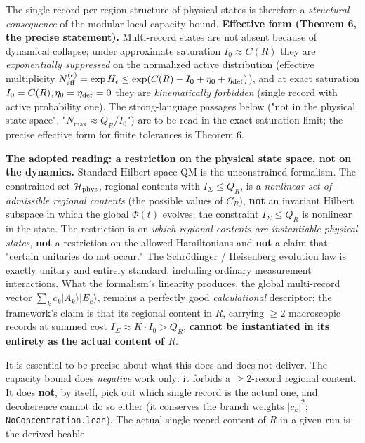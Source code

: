 \documentclass[11pt,a4paper]{article}
\begin{document}
The single-record-per-region structure of physical states is therefore a \emph{structural consequence} of the modular-local capacity bound. \textbf{Effective form (Theorem 6, the precise statement).} Multi-record states are not absent because of dynamical collapse; under approximate saturation $I_0 \approx C(R)$ they are \emph{exponentially suppressed} on the normalized active distribution (effective multiplicity $N^{(\epsilon)}_{\rm eff} = \exp H_\epsilon \le \exp(C(R) - I_0 + \eta_0 + \eta_{\rm def})$), and at exact saturation $I_0 = C(R), \eta_0 = \eta_{\rm def} = 0$ they are \emph{kinematically forbidden} (single record with active probability one). The strong-language passages below ("not in the physical state space", "$N_{\max} \approx Q_R/I_0$") are to be read in the exact-saturation limit; the precise effective form for finite tolerances is Theorem 6.

\textbf{The adopted reading: a restriction on the physical state space, not on the dynamics.} Standard Hilbert-space QM is the unconstrained formalism. The constrained set $\mathcal{H}_{\rm phys}$, regional contents with $I_\Sigma \le Q_R$, is a \emph{nonlinear set of admissible regional contents} (the possible values of $C_R$), \textbf{not} an invariant Hilbert subspace in which the global $\Phi(t)$ evolves; the constraint $I_\Sigma \le Q_R$ is nonlinear in the state. The restriction is on \emph{which regional contents are instantiable physical states}, \textbf{not} a restriction on the allowed Hamiltonians and \textbf{not} a claim that "certain unitaries do not occur." The Schrödinger / Heisenberg evolution law is exactly unitary and entirely standard, including ordinary measurement interactions. What the formalism's linearity produces, the global multi-record vector $\sum_k c_k |A_k\rangle|E_k\rangle$, remains a perfectly good \emph{calculational} descriptor; the framework's claim is that its regional content in $R$, carrying $\ge 2$ macroscopic records at summed cost $I_\Sigma \approx K \cdot I_0 > Q_R$, \textbf{cannot be instantiated in its entirety as the actual content of $R$}.

It is essential to be precise about what this does and does not deliver. The capacity bound does \emph{negative} work only: it forbids a $\ge 2$-record regional content. It does \textbf{not}, by itself, pick out which single record is the actual one, and decoherence cannot do so either (it conserves the branch weights $|c_k|^2$; \texttt{NoConcentration.lean}). The actual single-record content of $R$ in a given run is the derived beable
\end{document}
